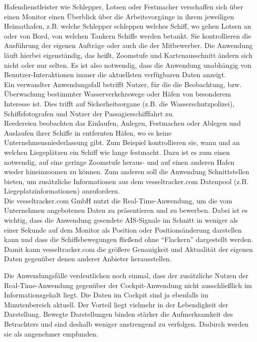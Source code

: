 Hafendienstleister wie Schlepper, Lotsen oder Festmacher verschaffen sich über einen Monitor einen Überblick über die Arbeitsvorgänge in ihrem jeweiligen Heimathafen, z.B. welche Schlepper schleppen welches Schiff, wo gehen Lotsen an oder von Bord, von welchen Tankern Schiffe werden betankt. Sie kontrollieren die Ausführung der eigenen Aufträge oder auch die der Mitbewerber.
Die Anwendung läuft hierbei eigenständig, das heißt, Zoomstufe und Kartenausschnitt ändern sich nicht oder nur selten. Es ist also notwendig, dass die Anwendung unabhängig von Benutzer-Interaktionen immer die aktuellsten verfügbaren Daten anzeigt.\\
Ein verwandter Anwendungsfall betrifft Nutzer, für die die Beobachtung, bzw. Überwachung bestimmter Wasserverkehrswege oder Häfen von besonderem Interesse ist. Dies trifft auf Sicherheitsorgane (z.B. die Wasserschutzpolizei), Schiffsfotografen und Nutzer der Passagierschifffahrt zu.\\
Reedereien beobachten das Einlaufen, Anlegen, Festmachen oder Ablegen und Auslaufen ihrer Schiffe in entfernten Häfen, wo es keine Unternehmensniederlassung gibt. Zum Beispiel kontrollieren sie, wann und an welchen Liegeplätzen ein Schiff wie lange festmacht.
Dazu ist es zum einen notwendig, auf eine geringe Zoomstufe heraus- und auf einen anderen Hafen wieder hineinzoomen zu können. Zum anderen soll die Anwendung Schnittstellen bieten, um zusätzliche Informationen aus dem vesseltracker.com Datenpool (z.B. Liegeplatzinformationen) anzufordern.\\
Die vesseltracker.com GmbH nutzt die Real-Time-Anwendung, um die vom Unternehmen angebotenen Daten zu präsentieren und zu bewerben. Dabei ist es wichtig, dass die Anwendung gesendete AIS-Signale im Schnitt in weniger als einer Sekunde auf dem Monitor als Position oder Positionsänderung darstellen kann und dass die Schiffsbewegungen fließend ohne  “Flackern” dargestellt werden. Damit kann vesseltracker.com die größere Genauigkeit und Aktualität der eigenen Daten gegenüber denen anderer Anbieter herausstellen.

Die Anwendungsfälle verdeutlichen noch einmal, dass der zusätzliche Nutzen der Real-Time-Anwendung gegenüber der Cockpit-Anwendung nicht ausschließlich im Informationsgehalt liegt. Die Daten im Cockpit sind ja ebenfalls im Minutenbereich aktuell. Der Vorteil liegt vielmehr in der Lebendigkeit der Darstellung. Bewegte Darstellungen binden stärker die Aufmerksamkeit des Betrachters und sind deshalb weniger anstrengend zu verfolgen. Dadurch werden sie als angenehmer empfunden.
\newpage
